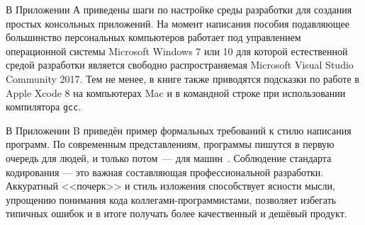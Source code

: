 В Приложении А приведены шаги по настройке среды разработки для создания простых консольных
приложений. На момент написания пособия подавляющее большинство персональных компьютеров работает
под управлением операционной системы Microsoft Windows 7 или 10 для которой естественной средой
разработки является свободно распространяемая Microsoft Visual Studio Community 2017. Тем не менее,
в книге также приводятся подсказки по работе в Apple Xcode 8 на компьютерах Mac и в командной строке
при использовании компилятора \texttt{gcc}.

В Приложении B приведён пример формальных требований к стилю написания программ. По современным
представлениям, программы пишутся в первую очередь для людей, и только потом~--- для
машин~\cite{mcconnel2015code}. Соблюдение стандарта кодирования --- это важная составляющая
профессиональной разработки. Аккуратный <<почерк>> и стиль изложения способствует ясности мысли,
упрощению понимания кода коллегами-программистами, позволяет избегать типичных ошибок и в итоге
получать более качественный и дешёвый продукт.
